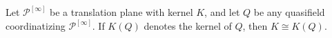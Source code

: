 Let $\mathcal{P}^{[\infty]}$ be a translation plane with kernel $K$, and let $Q$ be any quasifield coordinatizing $\mathcal{P}^{[\infty]}$. If $K(Q)$ denotes the kernel of $Q$, then $K \cong K(Q)$.
